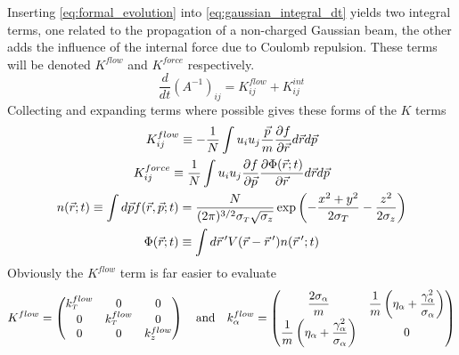 Inserting \ref{eq:formal_evolution} into \ref{eq:gaussian_integral_dt} yields two integral terms, one related to the propagation of a non-charged Gaussian beam, the other adds the influence of the internal force due to Coulomb repulsion.
These terms will be denoted $K^{flow}$ and $K^{force}$ respectively.
\begin{equation} \label{eq:gaussian_integral_dt_k}
  \frac{d}{dt}(A^{-1})_{ij} = K^{flow}_{ij} + K^{int}_{ij}
\end{equation}
Collecting and expanding terms where possible gives these forms of the $K$ terms
\begin{gather}
  K^{flow}_{ij} \equiv -\frac{1}{N} \int u_i u_j \frac{\vec{p}}{m} \frac{\partial f}{\partial \vec{r}} d\vec{r} d\vec{p} \\
  \label{eq:Kforce}
  K^{force}_{ij} \equiv \frac{1}{N} \int u_i u_j \frac{\partial f}{\partial \vec{p}} \frac{\partial \Phi(\vec{r};t)}{\partial \vec{r}} d\vec{r} d\vec{p} \\
  n(\vec{r};t) \equiv \int d\vec{p} f(\vec{r},\vec{p};t) 
    = \frac{N}{(2\pi)^{3/2} \sigma_{{\scriptscriptstyle T}} \sqrt{\sigma_{z}}} \exp \left( -\frac{x^2+y^2}{2\sigma_{T}} - \frac{z^2}{2\sigma_{z}} \right) \\
    \label{eq:potential_integral}
    \Phi(\vec{r};t) \equiv \int d\vec{r}\,^{\prime} V(\vec{r} - \vec{r}\,^{\prime}) n(\vec{r}\,^{\prime}; t)
\end{gather}
Obviously the $K^{flow}$ term is far easier to evaluate
\begin{equation}
  K^{flow} = 
  \begin{pmatrix}
    k^{flow}_{{\scriptscriptstyle T}} & 0 & 0 \\
    0 & k^{flow}_{{\scriptscriptstyle T}} & 0 \\
    0 & 0 & k^{flow}_{z}
  \end{pmatrix}
  \quad \text{and} \quad
  k^{flow}_{\alpha} = 
  \begin{pmatrix}
    \dfrac{2\sigma_{\alpha}}{m} & \dfrac{1}{m} \left(\eta_{\alpha} + \dfrac{\gamma_{\alpha}^2}{\sigma_{\alpha}} \right) \\
    \dfrac{1}{m} \left(\eta_{\alpha} + \dfrac{\gamma_{\alpha}^2}{\sigma_{\alpha}} \right) & 0
  \end{pmatrix}
\end{equation}

